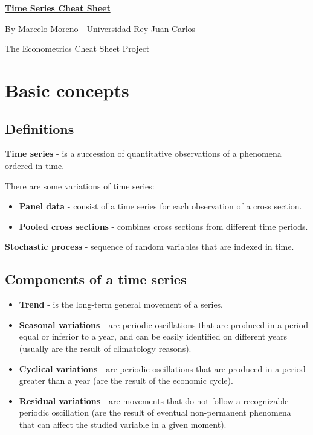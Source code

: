 \documentclass[10pt, a4paper, landscape]{extarticle}
\begin{document}
\setlength{\footskip}{12pt}

\begin{multicols}{3}

\begin{center}
	\textbf{\LARGE \href{https://github.com/marcelomijas/econometrics-cheatsheet}{Time Series Cheat Sheet}}

	{\footnotesize By Marcelo Moreno - Universidad Rey Juan Carlos}

	{\footnotesize The Econometrics Cheat Sheet Project}
\end{center}

\section*{Basic concepts}

\subsection*{Definitions}

\textbf{Time series} - is a succession of quantitative observations of a phenomena ordered in time.

There are some variations of time series:

\begin{itemize}[leftmargin=*]
	\item \textbf{Panel data} - consist of a time series for each observation of a cross section.
	\item \textbf{Pooled cross sections} - combines cross sections from different time periods.
\end{itemize}

\textbf{Stochastic process} - sequence of random variables that are indexed in time.

\subsection*{Components of a time series}

\begin{itemize}[leftmargin=*]
	\item \textbf{Trend} - is the long-term general movement of a series.
	\item \textbf{Seasonal variations} - are periodic oscillations that are produced in a period equal or inferior to a year, and can be easily identified on different years (usually are the result of climatology reasons).
	\item \textbf{Cyclical variations} - are periodic oscillations that are produced in a period greater than a year (are the result of the economic cycle).
	\item \textbf{Residual variations} - are movements that do not follow a recognizable periodic oscillation (are the result of eventual non-permanent phenomena that can affect the studied variable in a given moment).
\end{itemize}


\end{multicols}
\end{document}
